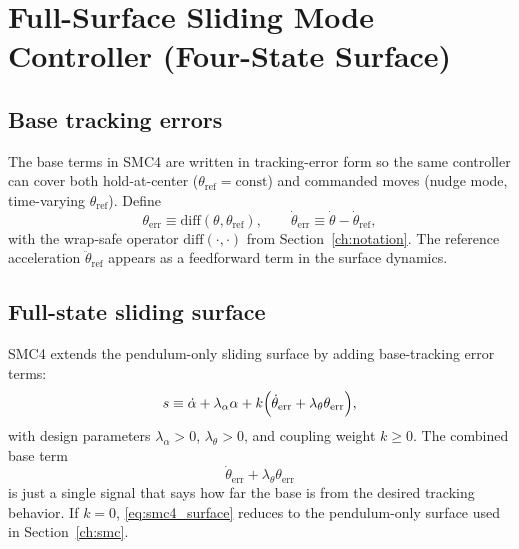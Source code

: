 \section{Full-Surface Sliding Mode Controller (Four-State Surface)}
\label{ch:smc4}

\subsection{Base tracking errors}
The base terms in SMC4 are written in tracking-error form so the same controller can cover both hold-at-center ($\theta_{\mathrm{ref}}=\mathrm{const}$) and commanded moves (nudge mode, time-varying $\theta_{\mathrm{ref}}$). Define
\[
\theta_{\mathrm{err}} \equiv \mathrm{diff}(\theta,\theta_{\mathrm{ref}}),\qquad
\dot{\theta}_{\mathrm{err}} \equiv \dot{\theta}-\dot{\theta}_{\mathrm{ref}},
\]
with the wrap-safe operator $\mathrm{diff}(\cdot,\cdot)$ from Section~\ref{ch:notation}. The reference acceleration $\ddot{\theta}_{\mathrm{ref}}$ appears as a feedforward term in the surface dynamics.

\subsection{Full-state sliding surface}
SMC4 extends the pendulum-only sliding surface by adding base-tracking error terms:
\begin{equation}
s \equiv \dot{\alpha} + \lambda_{\alpha}\alpha
  + k\Bigl(\dot{\theta}_{\mathrm{err}} + \lambda_{\theta}\theta_{\mathrm{err}}\Bigr),
\label{eq:smc4_surface}
\end{equation}
with design parameters $\lambda_{\alpha}>0$, $\lambda_{\theta}>0$, and coupling weight $k\ge 0$. The combined base term
\[
\dot{\theta}_{\mathrm{err}} + \lambda_{\theta}\theta_{\mathrm{err}}
\]
is just a single signal that says how far the base is from the desired tracking behavior. If $k=0$, \eqref{eq:smc4_surface} reduces to the pendulum-only surface used in Section~\ref{ch:smc}.


